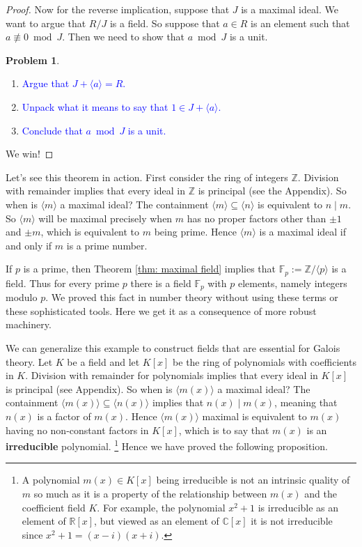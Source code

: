 \documentclass[11pt]{article}
\def\ZZ{\mathbb{Z}}
\def\FF{\mathbb{F}}
\def\RR{\mathbb{R}}
\def\CC{\mathbb{C}}
\theoremstyle{definition}
\newtheorem{problem}{Problem}[section]
\numberwithin{equation}{subsection}
\newcommand{\blue}[1]{\textcolor{blue}{#1}}
\begin{document}
\begin{proof}
    Now for the reverse implication, suppose that $J$ is a maximal ideal.
    We want to argue that $R/J$ is a field.
    So suppose that $a \in R$ is an element such that $a \not\equiv 0 \bmod J$.
    Then we need to show that $a \bmod J$ is a unit.

    \begin{problem}
    \,
        \begin{enumerate}
            \item \blue{Argue that $J + \langle a \rangle = R$.}
            \item \blue{Unpack what it means to say that $1 \in J + \langle a \rangle$.}
            \item \blue{Conclude that $a \bmod J$ is a unit.}
        \end{enumerate}
    \end{problem}
    We win!
\end{proof}

Let's see this theorem in action.
First consider the ring of integers $\ZZ$.
Division with remainder implies that every ideal in $\ZZ$ is principal (see the Appendix). 
So when is $\langle m \rangle$ a maximal ideal?
The containment $\langle m\rangle \subseteq \langle n \rangle$ is equivalent to $n \mid m$.
So $\langle m \rangle$ will be maximal precisely when $m$ has no proper factors other than $\pm 1$ and $\pm m$, which is equivalent to $m$ being prime.
Hence $\langle m \rangle$ is a maximal ideal if and only if $m$ is a prime number.

If $p$ is a prime, then Theorem \ref{thm: maximal field} implies that $\FF_p := \ZZ/\langle p\rangle$ is a field.
Thus for every prime $p$ there is a field $\FF_p$ with $p$ elements, namely integers modulo $p$.
We proved this fact in number theory without using these terms or these sophisticated tools.
Here we get it as a consequence of more robust machinery.

We can generalize this example to construct fields that are essential for Galois theory.
Let $K$ be a field and let $K[x]$ be the ring of polynomials with coefficients in $K$.
Division with remainder for polynomials implies that every ideal in $K[x]$ is principal (see Appendix).
So when is $\langle m(x)\rangle$ a maximal ideal?
The containment $\langle m(x)\rangle \subseteq \langle n(x)\rangle$ implies that $n(x) \mid m(x)$, meaning that $n(x)$ is a factor of $m(x)$.
Hence $\langle m(x)\rangle$ maximal is equivalent to $m(x)$ having no non-constant factors in $K[x]$, which is to say that $m(x)$ is an \textbf{irreducible} polynomial.
\footnote{A polynomial $m(x) \in K[x]$ being irreducible is not an intrinsic quality of $m$ so much as it is a property of the relationship between $m(x)$ and the coefficient field $K$.
For example, the polynomial $x^2 + 1$ is irreducible as an element of $\RR[x]$, but viewed as an element of $\CC[x]$ it is not irreducible since $x^2 + 1 = (x - i)(x + i)$.}
Hence we have proved the following proposition.
\end{document}
